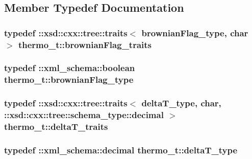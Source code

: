 \subsection{Member Typedef Documentation}
\hypertarget{classthermo__t_a8d99eb3bef87e3c08389e73aae1bf5d1}{
\subsubsection[{brownian\-Flag\-\_\-traits}]{\setlength{\rightskip}{0pt plus 5cm}typedef \-::xsd\-::cxx\-::tree\-::traits$<$ {\bf brownian\-Flag\-\_\-type}, char $>$ {\bf thermo\-\_\-t\-::brownian\-Flag\-\_\-traits}}}\label{classthermo__t_a8d99eb3bef87e3c08389e73aae1bf5d1}
\hypertarget{classthermo__t_a124b0a16394a6c7839596d1a8ba5c35b}{
\subsubsection[{brownian\-Flag\-\_\-type}]{\setlength{\rightskip}{0pt plus 5cm}typedef \-::{\bf xml\-\_\-schema\-::boolean} {\bf thermo\-\_\-t\-::brownian\-Flag\-\_\-type}}}\label{classthermo__t_a124b0a16394a6c7839596d1a8ba5c35b}
\hypertarget{classthermo__t_a06c22e5c3354971550c96f08602ccff6}{
\subsubsection[{delta\-T\-\_\-traits}]{\setlength{\rightskip}{0pt plus 5cm}typedef \-::xsd\-::cxx\-::tree\-::traits$<$ {\bf delta\-T\-\_\-type}, char, \-::xsd\-::cxx\-::tree\-::schema\-\_\-type\-::decimal $>$ {\bf thermo\-\_\-t\-::delta\-T\-\_\-traits}}}\label{classthermo__t_a06c22e5c3354971550c96f08602ccff6}
\hypertarget{classthermo__t_af616f20681b799198b8c97c235092181}{
\subsubsection[{delta\-T\-\_\-type}]{\setlength{\rightskip}{0pt plus 5cm}typedef \-::{\bf xml\-\_\-schema\-::decimal} {\bf thermo\-\_\-t\-::delta\-T\-\_\-type}}}\label{classthermo__t_af616f20681b799198b8c97c235092181}
